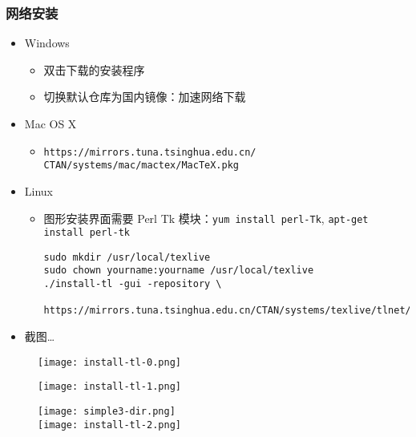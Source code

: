 \begin{frame}[fragile]
  \frametitle{网络安装}
  \begin{itemize}
    \item Windows
      \begin{itemize}
        \item 双击下载的安装程序
        \item 切换默认仓库为国内镜像：加速网络下载
      \end{itemize}
    \item Mac OS X
      \begin{itemize}
        \item \texttt{https://mirrors.tuna.tsinghua.edu.cn/\\CTAN/systems/mac/mactex/MacTeX.pkg}
      \end{itemize}
    \item Linux
      \begin{itemize}
        \item 图形安装界面需要 Perl Tk 模块：\texttt{yum install
          perl-Tk}, \texttt{apt-get install perl-tk}
          \begin{verbatim}
sudo mkdir /usr/local/texlive
sudo chown yourname:yourname /usr/local/texlive
./install-tl -gui -repository \
    https://mirrors.tuna.tsinghua.edu.cn/CTAN/systems/texlive/tlnet/
          \end{verbatim}
      \end{itemize}
\item 截图\dots
\end{itemize}
\end{frame}

\begin{frame}
  \begin{figure}[h]
    \centering
    \texttt{[image: install-tl-0.png]}
  \end{figure}
\end{frame}

\begin{frame}
  \begin{figure}[h]
    \centering
    \texttt{[image: install-tl-1.png]}
  \end{figure}
\end{frame}

\begin{frame}
  \begin{figure}[h]
    \centering
    \texttt{[image: simple3-dir.png]}\\
    \texttt{[image: install-tl-2.png]}
  \end{figure}
\end{frame}

